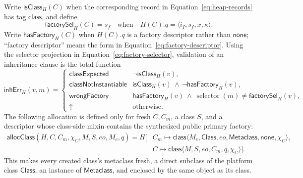 \documentclass[11pt]{article}
\numberwithin{equation}{section}
\newcommand{\kw}[1]{\ensuremath{\mathsf{#1}}}
\newcommand{\undef}{\mathord{\uparrow}}
\newcommand{\selector}{\mathop{\mathrm{selector}}}
\begin{document}
Write $\mathsf{isClass}_H(C)$ when the corresponding record in
Equation~\eqref{eq:heap-records} has tag \kw{class}, and define
\begin{equation}\label{eq:factory-selector}
 \mathsf{factorySel}_H(C)=s_f
 \quad\text{when}\quad
 H(C).q=\langle i_I,s_f,\bar x,\kappa\rangle.
\end{equation}
Write $\mathsf{hasFactory}_H(C)$ when $H(C).q$ is a factory descriptor rather
than \kw{none}; ``factory descriptor'' means the form in
Equation~\eqref{eq:factory-descriptor}.  Using the selector projection in
Equation~\eqref{eq:factory-selector}, validation of an inheritance clause is
the total function
\begin{equation}\label{eq:inheritance-error}
 \mathsf{inhErr}_H(v,m)=
 \begin{cases}
  \kw{classExpected} & \neg\mathsf{isClass}_H(v),\\
  \kw{classNotInstantiable} & \mathsf{isClass}_H(v)\ \land\
       \neg\mathsf{hasFactory}_H(v),\\
  \kw{wrongFactory} & \mathsf{hasFactory}_H(v)\ \land\
       \selector(m)\ne\mathsf{factorySel}_H(v),\\
  \undef & \text{otherwise.}
 \end{cases}
\end{equation}
The following allocation is defined only for fresh $C,C_m$, a class $S$, and a
descriptor whose class-side mixin contains the synthesized public primary
factory:
\begin{equation}\label{eq:allocate-class}
\begin{aligned}
 \mathsf{allocClass}(H,C,C_m,\chi_C,M,S,eo,M_c,q)
   =H[&C_m\mapsto\kw{class}\langle
        M_c,\kw{Class},eo,\kw{Metaclass},\kw{none},\chi_C\rangle,\\[-1mm]
      &C\mapsto\kw{class}\langle M,S,eo,C_m,q,\chi_C\rangle].
\end{aligned}
\end{equation}
This makes every created class's metaclass fresh, a direct subclass of the
platform class \kw{Class}, an instance of \kw{Metaclass}, and enclosed by the
same object as its class.
\end{document}
